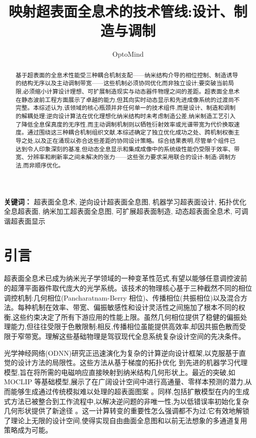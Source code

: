 \documentclass[11pt]{article}
\title{映射超表面全息术的技术管线:设计、制造与调制}
\author{OptoMind}
\date{}
\begin{document}
\maketitle

\begin{abstract}
基于超表面的全息术性能受三种耦合机制支配------纳米结构介导的相位控制、制造诱导的结构无序以及主动调制带宽------这些机制必须协同优化而非独立设计;要突破当前局限,必须缩小计算设计理想、可扩展制造现实与动态器件物理之间的差距。超表面全息术在静态波前工程方面展示了卓越的能力,但其向实时动态显示和先进成像系统的过渡尚不完整。本综述认为,该领域的核心瓶颈并非任何单一的技术组件,而是设计、制造和调制的解耦处理:逆向设计算法在优化理想化纳米结构时未考虑制造公差,纳米制造工艺引入了降低全息保真度的无序性,而主动调制机制则以牺牲衍射效率或光谱带宽为代价换取速度。通过围绕这三种耦合机制组织文献,本综述确定了独立优化成功之处、跨机制权衡主导之处,以及正在涌现以弥合这些差距的协同设计策略。综合结果表明,尽管单个组件已达到令人印象深刻的基准,但动态全息显示和集成成像中的系统级性能仍受限于效率、带宽、分辨率和刷新率之间未解决的张力------这些张力要求采用联合的设计-制造-调制方法,而非顺序优化。
\end{abstract}

\noindent\textbf{关键词：} 超表面全息术, 逆向设计超表面全息图, 机器学习超表面设计, 拓扑优化全息超表面, 纳米加工超表面全息图, 可扩展超表面制造, 动态超表面全息术, 可调谐超表面显示

\section{引言}\label{ux5f15ux8a00}

超表面全息术已成为纳米光子学领域的一种变革性范式,有望以能够任意调控波前的超薄平面器件取代庞大的光学系统。该技术的物理核心基于三种截然不同的相位调控机制:几何相位(Pancharatnam-Berry 相位)、传播相位(共振相位)以及混合方法。每种机制在效率、带宽、偏振敏感性和设计灵活性之间施加了根本不同的权衡,这些约束决定了所有下游应用的性能上限。虽然几何相位提供了稳健的偏振处理能力,但往往受限于色散限制;相反,传播相位虽能提供高效率,却因共振色散而受限于窄带宽。理解这些基础物理是驾驭现代全息系统复杂设计空间的先决条件。

光学神经网络(ODNN)研究正迅速演化为复杂的计算逆向设计框架,以克服基于直觉的设计方法的局限性。这些方法从基于梯度的拓扑优化 \citep{doi_10_2528_pier12020501_bb5007b1} 到先进的机器学习代理模型,旨在将所需的电磁响应直接映射到纳米结构几何形状上。最近的突破,如 MOCLIP 等基础模型,展示了在广阔设计空间中进行高通量、零样本预测的潜力,从而能够生成通过传统模拟难以处理的超表面图案 \citep{doi_10_1038_s41467_026_76714_x_8ca5d39b}。同样,包括扩散模型在内的生成式方法已被整合到工作流程中,以解决逆问题的非唯一性,为以低错误率初始化复杂几何形状提供了新途径 \citep{doi_10_48550_arxiv_2506_21748_dc49c062}。这一计算转变的重要性怎么强调都不为过:它有效地解锁了理论上无限的设计空间,使得实现自由曲面全息图和以前无法想象的多通道复用策略成为可能。
\end{document}
